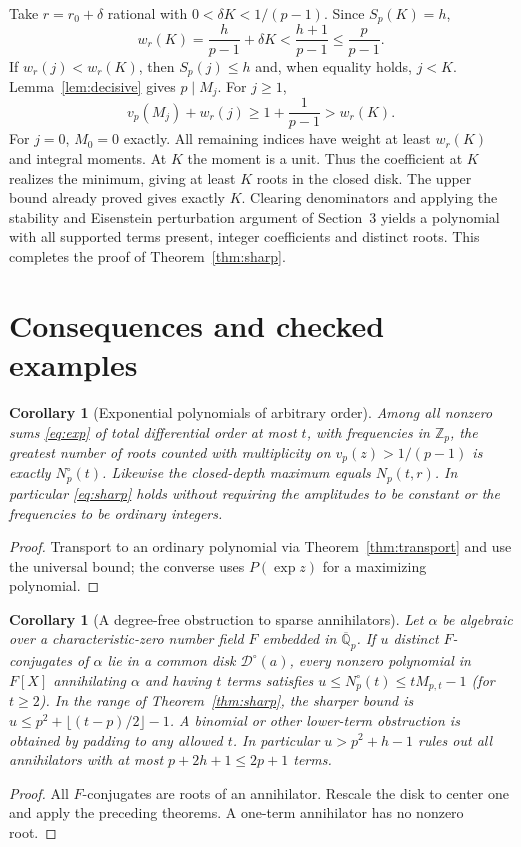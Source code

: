 \documentclass[11pt]{article}
\newtheorem{corollary}[theorem]{Corollary}
\theoremstyle{remark}\newtheorem{remark}[theorem]{Remark}
\newcommand{\Q}{\mathbb Q}\newcommand{\Z}{\mathbb Z}\newcommand{\F}{\mathbb F}\newcommand{\C}{\mathbb C}
\newcommand{\vp}{v_p}\newcommand{\ord}{\operatorname{ord}}\newcommand{\spn}{\operatorname{span}}\newcommand{\res}{\operatorname{res}}
\newcommand{\D}{\mathcal D}\newcommand{\R}{\mathcal R}\newcommand{\Ocal}{\mathcal O}
\begin{document}
Take $r=r_0+\delta$ rational with $0<\delta K<1/(p-1)$. Since $S_p(K)=h$,
\[
 w_r(K)=\frac h{p-1}+\delta K<\frac{h+1}{p-1}\le\frac p{p-1}.
\]
If $w_r(j)<w_r(K)$, then $S_p(j)\le h$ and, when equality holds, $j<K$.
Lemma~\ref{lem:decisive} gives $p\mid M_j$. For $j\ge1$,
\[
 \vp(M_j)+w_r(j)\ge1+\frac1{p-1}>w_r(K).
\]
For $j=0$, $M_0=0$ exactly. All remaining indices have weight at least $w_r(K)$ and
integral moments. At $K$ the moment is a unit. Thus the coefficient at $K$ realizes
the minimum, giving at least $K$ roots in the closed disk. The upper bound already
proved gives exactly $K$. Clearing denominators and applying the stability and
Eisenstein perturbation argument of Section~3 yields a polynomial with all supported
terms present, integer coefficients and distinct roots. This completes the proof
of Theorem~\ref{thm:sharp}.

\section{Consequences and checked examples}

\begin{corollary}[Exponential polynomials of arbitrary order]\label{cor:exp}
Among all nonzero sums \eqref{eq:exp} of total differential order at most $t$, with
frequencies in $\Z_p$, the greatest number of roots counted with multiplicity on
$\vp(z)>1/(p-1)$ is exactly $N_p^\circ(t)$. Likewise the closed-depth maximum equals
$N_p(t,r)$. In particular \eqref{eq:sharp} holds without requiring the amplitudes to
be constant or the frequencies to be ordinary integers.
\end{corollary}
\begin{proof}
Transport to an ordinary polynomial via Theorem~\ref{thm:transport} and use the
universal bound; the converse uses $P(\exp z)$ for a maximizing polynomial.
\end{proof}

\begin{corollary}[A degree-free obstruction to sparse annihilators]\label{cor:annihilator}
Let $\alpha$ be algebraic over a characteristic-zero number field $F$ embedded in
$\overline{\Q}_p$. If $u$ distinct $F$-conjugates of $\alpha$ lie in a common disk
$\D^\circ(a)$, every nonzero polynomial in $F[X]$ annihilating $\alpha$ and having
$t$ terms satisfies $u\le N_p^\circ(t)\le tM_{p,t}-1$ (for $t\ge2$).
In the range of Theorem~\ref{thm:sharp}, the sharper bound is
$u\le p^2+\lfloor(t-p)/2\rfloor-1$. A binomial or other lower-term obstruction is
obtained by padding to any allowed $t$. In particular $u>p^2+h-1$ rules out all
annihilators with at most $p+2h+1\le2p+1$ terms.
\end{corollary}
\begin{proof}
All $F$-conjugates are roots of an annihilator. Rescale the disk to center one and
apply the preceding theorems. A one-term annihilator has no nonzero root.
\end{proof}
\end{document}
